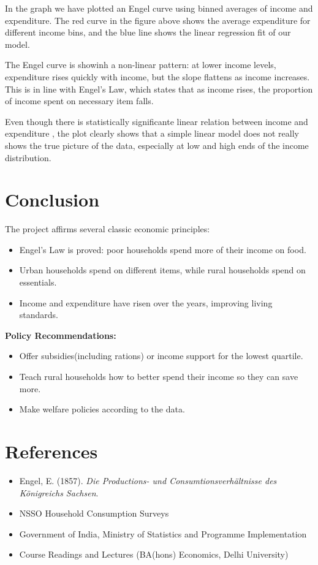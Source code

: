 \documentclass[12pt]{article}
\begin{document}
\vspace{1em}
In the graph we have plotted an Engel curve using binned averages of income and expenditure. The red curve in the figure above shows the average expenditure for different income bins, and the blue line shows the linear regression fit of our model.

The Engel curve is showinh a non-linear pattern: at lower income levels, expenditure rises quickly with income, but the slope flattens as income increases. This is in line with Engel’s Law, which states that as income rises, the proportion of income spent on necessary item falls.

Even though there is statistically significante linear relation between income and expenditure  , the plot clearly shows that a simple linear model does not really shows the true picture of the data, especially at low and high ends of the income distribution.


\section{Conclusion}
The project affirms several classic economic principles:
\begin{itemize}
    \item Engel’s Law is proved: poor households spend more of their income on food.
    \item Urban households spend on different items, while rural households spend on essentials.
    \item Income and expenditure have risen over the years, improving living standards.
\end{itemize}

\textbf{Policy Recommendations:}
\begin{itemize}
    \item Offer subsidies(including rations) or income support for the lowest quartile.
    \item Teach rural households how to better spend their income so they can save more.
    \item Make welfare policies according to the data.
\end{itemize}

\section{References}
\begin{itemize}
    \item Engel, E. (1857). \textit{Die Productions- und Consumtionsverhältnisse des Königreichs Sachsen}.
    \item NSSO Household Consumption Surveys
    \item Government of India, Ministry of Statistics and Programme Implementation
    \item Course Readings and Lectures (BA(hons) Economics, Delhi University)
\end{itemize}
\end{document}
